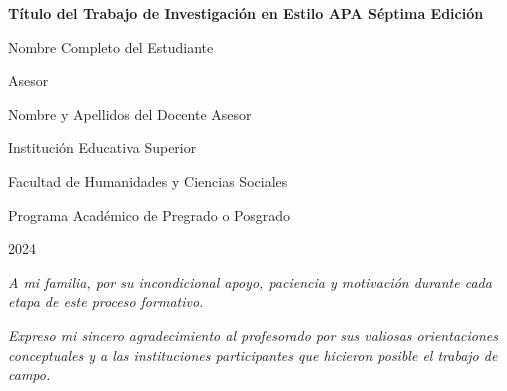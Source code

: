 \documentclass[12pt,letterpaper]{article}
\begin{document}
\begin{titlepage}
    \pagestyle{fancy}
    \fancyhf{}
    \rhead{\thepage}
    \vspace*{2cm}
    \begin{center}
        {\bfseries\large Título del Trabajo de Investigación en Estilo APA Séptima Edición\par}
        \vspace{2.5cm}
        {Nombre Completo del Estudiante\par}
        \vspace{2.5cm}
        {Asesor\par}
        {Nombre y Apellidos del Docente Asesor\par}
        \vfill
        {Institución Educativa Superior\par}
        {Facultad de Humanidades y Ciencias Sociales\par}
        {Programa Académico de Pregrado o Posgrado\par}
        {2024\par}
    \end{center}
\end{titlepage}

\clearpage
\vspace*{\fill}
\begin{center}
    \textit{A mi familia, por su incondicional apoyo, paciencia y motivación durante cada etapa de este proceso formativo.}
\end{center}
\vspace*{\fill}

\clearpage
\vspace*{\fill}
\begin{center}
    \textit{Expreso mi sincero agradecimiento al profesorado por sus valiosas orientaciones conceptuales y a las instituciones participantes que hicieron posible el trabajo de campo.}
\end{center}
\vspace*{\fill}
\end{document}
